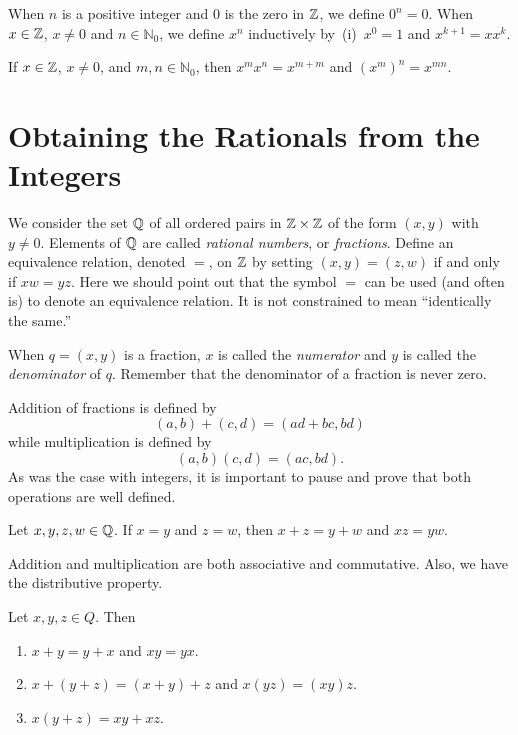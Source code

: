 When $n$ is a positive integer and $0$ is the zero in $\mathbb{Z}$, we
define $0^n=0$.  When $x\in\mathbb{Z}$, $x\neq 0$ and $n\in\mathbb{N}_0$,
we define $x^n$ inductively by~(i)~$x^0=1$ and $x^{k+1}=xx^k$.

\begin{theorem}
If $x\in\mathbb{Z}$, $x\neq0$, and $m,n\in\mathbb{N}_0$, then
$x^mx^n=x^{m+m}$ and $(x^m)^n=x^{mn}$.
\end{theorem}

\section{Obtaining the Rationals from the Integers}\label{s:rationals}

We consider the set $\mathbb{Q}$ of all ordered pairs in $\mathbb{Z}\times \mathbb{Z}$ of
the form $(x,y)$ with $y\neq 0$. Elements of $\mathbb{Q}$ are called
\textit{rational numbers}, or \textit{fractions}.  Define
an equivalence relation, denoted $=$, on $\mathbb{Z}$ by
setting $(x,y)=(z,w)$ if and only if $xw=yz$.  Here we
should point out that the symbol $=$ can be used (and often is)
to denote an equivalence relation. It is not constrained to mean ``identically
the same.''
  
When $q=(x,y)$ is a fraction, $x$ is called the \textit{numerator}
and $y$ is called the \textit{denominator} of $q$.  
Remember that the denominator of a fraction is never zero.

Addition of fractions is defined by 
\[
(a,b)+(c,d) = (ad+bc,bd)
\]
while multiplication is defined by
\[
(a,b)(c,d) = (ac,bd).
\]
As was the case with integers, it is important to pause
and prove that both operations are well defined.

\begin{theorem}
Let $x,y,z,w\in\mathbb{Q}$.
If $x=y$ and $z=w$, then $x+z=y+w$ and $xz=yw$.
\end{theorem} 

Addition and multiplication are both associative and commutative. 
Also, we have the distributive property.

\begin{theorem}
Let $x,y,z\in Q$.  Then
\begin{enumerate}
\item $x+y=y+x$ and $xy=yx$.
\item $x+(y+z) = (x+y)+z$ and $x(yz)=(xy)z$.
\item $x(y+z)=xy+xz$.
\end{enumerate}
\end{theorem}

